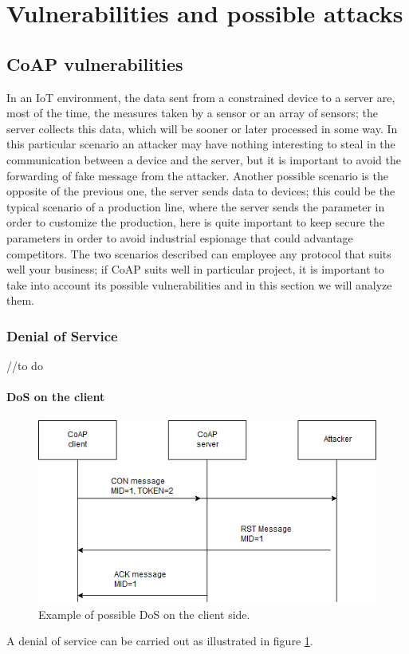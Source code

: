 	\section{Vulnerabilities and possible attacks}
	
	\subsection{CoAP vulnerabilities}
	In an IoT environment, the data sent from a constrained device to a server are, most of the time, the measures taken by a sensor or an array of sensors; the server collects this data, which will be sooner or later processed in some way.\newline
	In this particular scenario an attacker may have nothing interesting to steal in the communication between a device and the server, but it is important to avoid the forwarding of fake message from the attacker.\newline
	Another possible scenario is the opposite of the previous one, the server sends data to devices; this could be the typical scenario of a production line, where the server sends the parameter in order to customize the production, here is quite important to keep secure the parameters in order to avoid industrial espionage that could advantage competitors.\newline
	The two scenarios described can employee any protocol that suits well your business; if CoAP suits well in particular project, it is important to take into account its possible vulnerabilities and in this section we will analyze them.\newline
	
	\subsubsection{Denial of Service}
	//to do
	
	\paragraph{DoS on the client}
	\begin{figure}
		\includegraphics[width=\linewidth]{coap-vuln-img0.png}
		\caption{Example of possible DoS on the client side.}
		\label{fig:coap-vuln0}
	\end{figure}
	A denial of service can be carried out as illustrated in figure \ref{fig:coap-vuln0}.\newline
	
